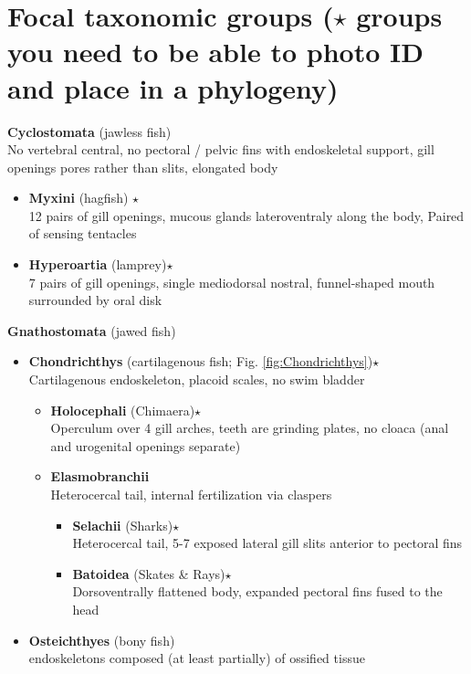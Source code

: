 \documentclass[a4paper,12pt]{article}
\begin{document}
\section*{Focal taxonomic groups ($\star$ groups you need to be able to photo ID and place in a phylogeny)}
\begin{description}
\item\textbf{Cyclostomata} (jawless fish) \\ No vertebral central, no pectoral / pelvic fins with endoskeletal support, gill openings pores rather than slits, elongated body
\begin{itemize}
  \item{\textbf{Myxini} (hagfish) $\star$}\\ 12 pairs of gill openings, mucous glands lateroventraly along the body, Paired of sensing tentacles
  \item{\textbf{Hyperoartia} (lamprey)$\star$}\\ 7 pairs of gill openings, single mediodorsal nostral, funnel-shaped mouth surrounded by oral disk
\end{itemize}
\item\textbf{Gnathostomata} (jawed fish)
\begin{itemize}
  \item{\textbf{Chondrichthys} (cartilagenous fish; Fig. \ref{fig:Chondrichthys})}$\star$\\ Cartilagenous endoskeleton, placoid scales, no swim bladder
  \begin{itemize}
    \item{\textbf{Holocephali} (Chimaera)$\star$}\\ Operculum over 4 gill arches, teeth are grinding plates, no cloaca (anal and urogenital openings separate)
    \item{\textbf{Elasmobranchii}} \\ Heterocercal tail, internal fertilization via claspers
    \begin{itemize}
      \item{\textbf{Selachii} (Sharks)$\star$}\\ Heterocercal tail, 5-7 exposed lateral gill slits anterior to pectoral fins
      \item{\textbf{Batoidea} (Skates \& Rays)$\star$} \\ Dorsoventrally flattened body, expanded pectoral fins fused to the head
    \end{itemize}
  \end{itemize}
  \item{\textbf{Osteichthyes} (bony fish)} \\ endoskeletons composed (at least partially) of ossified tissue

\end{itemize}
\end{description}
\end{document}
